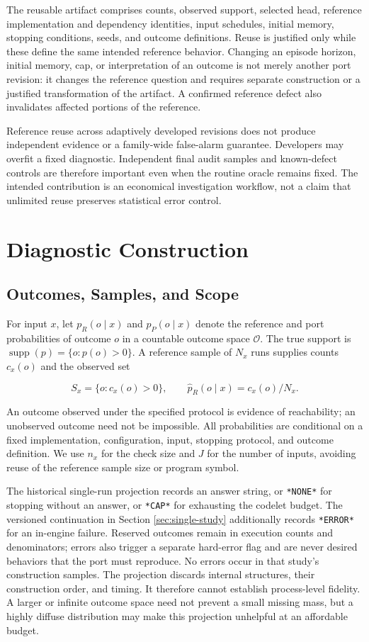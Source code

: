 \documentclass[10pt,letterpaper]{article}
\begin{document}
The reusable artifact comprises counts, observed support, selected head, reference
implementation and dependency identities, input schedules, initial memory, stopping
conditions, seeds, and outcome definitions. Reuse is justified only while these define the
same intended reference behavior. Changing an episode horizon, initial memory, cap, or
interpretation of an outcome is not merely another port revision: it changes the reference
question and requires separate construction or a justified transformation of the artifact.
A confirmed reference defect also invalidates affected portions of the reference.

Reference reuse across adaptively developed revisions does not produce independent
evidence or a family-wide false-alarm guarantee. Developers may overfit a fixed
diagnostic. Independent final audit samples and known-defect controls are therefore
important even when the routine oracle remains fixed. The intended contribution is an
economical investigation workflow, not a claim that unlimited reuse preserves statistical
error control.

\section{Diagnostic Construction}\label{sec:method}

\subsection{Outcomes, Samples, and Scope}\label{sec:outcomes}

For input \(x\), let \(p_R(o\mid x)\) and \(p_P(o\mid x)\) denote the reference and port
probabilities of outcome \(o\) in a countable outcome space \(\mathcal O\). The true
support is \(\operatorname{supp}(p)=\{o:p(o)>0\}\). A reference sample of \(N_x\) runs
supplies counts \(c_x(o)\) and the observed set

\[
S_x=\{o:c_x(o)>0\},\qquad \widehat p_R(o\mid x)=c_x(o)/N_x.
\]

An outcome observed under the specified protocol is evidence of reachability; an
unobserved outcome need not be impossible. All probabilities are conditional on a fixed
implementation, configuration, input, stopping protocol, and outcome definition. We use
\(n_x\) for the check size and \(J\) for the number of inputs, avoiding reuse of the
reference sample size or program symbol.

The historical single-run projection records an answer string, or \texttt{*NONE*} for
stopping without an answer, or \texttt{*CAP*} for exhausting the codelet budget. The
versioned continuation in Section \ref{sec:single-study} additionally records
\texttt{*ERROR*} for an in-engine failure. Reserved outcomes remain in execution counts
and denominators; errors also trigger a separate hard-error flag and are never desired
behaviors that the port must reproduce. No errors occur in that study's construction
samples. The projection discards internal structures, their construction order, and
timing. It therefore cannot establish process-level fidelity. A larger or infinite outcome
space need not prevent a small missing mass, but a highly diffuse distribution may make
this projection unhelpful at an affordable budget.
\end{document}
